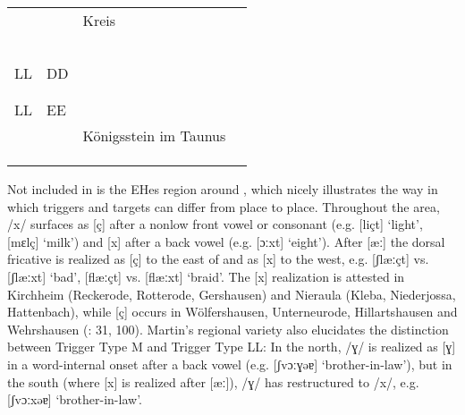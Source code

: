 \begin{table}
\begin{tabularx}{\textwidth}{llQQ}
   &    & Kreis    &\citet{Heidt1922}  \\
   &    &        &\citet{Schudt1927} \\
   &    &             &\citet{Noack1938}  \\
   &    &     &\citet{Müller1958a}\\
   &    &            &\citet{Müller1958b}\\
   &    &             &\citet{Dingeldein1995}\\
LL & DD &         & \citet{Leidolf1891} \\
   &    &            &\citet{Glöckner1913} \\
   &    &       &\citet{Wegera1977}\\
LL & EE &           & \citet{Friebertshäuser1961}\\
   &    & Königsstein im Taunus        & \citet{Schnellbacher1963}  \\
   &    &                 & \citet{Schudt1970}         \\
   &    &          & \citet{Post1985}\\
\lspbottomrule
\end{tabularx}
\end{table}

Not included in  is the EHes region around  \citep{Martin1957}, which nicely illustrates the way in which triggers and targets can differ from place to place. Throughout the area, /x/ surfaces as [ç] after a nonlow front vowel or consonant (e.g. [liçt] ‘light’, [mɛlç] ‘milk’) and [x] after a back vowel (e.g. [ɔːxt] ‘eight’). After [æː] the dorsal fricative is realized as [ç] to the east of  and as [x] to the west, e.g. [ʃlæːçt] vs. [ʃlæːxt] ‘bad’, [flæːçt] vs. [flæːxt] ‘braid’. The [x] realization is attested in Kirchheim (Reckerode, Rotterode, Gershausen) and Nieraula (Kleba, Niederjossa, Hattenbach), while [ç] occurs in Wölfershausen, Unterneurode, Hillartshausen and Wehrshausen (\citealt{Martin1957}: 31, 100). Martin’s regional variety also elucidates the distinction between Trigger Type M and Trigger Type LL: In the north, /ɣ/ is realized as [ɣ] in a word-internal onset after a back vowel (e.g. [ʃvɔːɣəɐ] ‘brother-in-law’), but in the south (where [x] is realized after [æː]), /ɣ/ has restructured to /x/, e.g. [ʃvɔːxəɐ] ‘brother-in-law’.

